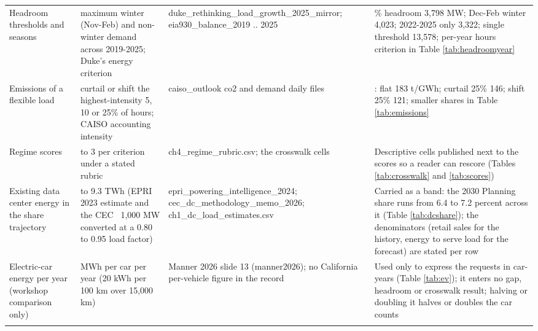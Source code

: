 \begin{longtable}{>{\raggedright\arraybackslash}p{2.3cm}>{\raggedright\arraybackslash}p{3.3cm}>{\raggedright\arraybackslash}p{2.8cm}>{\raggedright\arraybackslash}p{6.0cm}}
\addlinespace
Headroom thresholds and seasons & maximum winter (Nov-Feb) and non-winter demand across 2019-2025; Duke's energy criterion & duke\_\allowbreak{}rethinking\_\allowbreak{}load\_\allowbreak{}growth\_\allowbreak{}2025\_\allowbreak{}mirror; eia930\_\allowbreak{}balance\_\allowbreak{}2019 .. 2025 & 0.5\% headroom 3,798 MW; Dec-Feb winter 4,023; 2022-2025 only 3,322; single threshold 13,578; per-year hours criterion in Table \ref{tab:headroomyear} \\
\addlinespace
Emissions of a flexible load & curtail or shift the highest-intensity 5, 10 or 25\% of hours; CAISO accounting intensity & caiso\_\allowbreak{}outlook co2 and demand daily files & 2025: flat 183 t/GWh; curtail 25\% 146; shift 25\% 121; smaller shares in Table \ref{tab:emissions} \\
\addlinespace
Regime scores & 0 to 3 per criterion under a stated rubric & ch4\_\allowbreak{}regime\_\allowbreak{}rubric.csv; the crosswalk cells & Descriptive cells published next to the scores so a reader can rescore (Tables \ref{tab:crosswalk} and \ref{tab:scores}) \\
\addlinespace
Existing data center energy in the share trajectory & 7.0 to 9.3 TWh (EPRI 2023 estimate and the CEC ~1,000 MW converted at a 0.80 to 0.95 load factor) & epri\_\allowbreak{}powering\_\allowbreak{}intelligence\_\allowbreak{}2024; cec\_\allowbreak{}dc\_\allowbreak{}methodology\_\allowbreak{}memo\_\allowbreak{}2026; ch1\_\allowbreak{}dc\_\allowbreak{}load\_\allowbreak{}estimates.csv & Carried as a band: the 2030 Planning share runs from 6.4 to 7.2 percent across it (Table \ref{tab:dcshare}); the denominators (retail sales for the history, energy to serve load for the forecast) are stated per row \\
\addlinespace
Electric-car energy per year (workshop comparison only) & 3 MWh per car per year (20 kWh per 100 km over 15,000 km) & Manner 2026 slide 13 (manner2026); no California per-vehicle figure in the record & Used only to express the requests in car-years (Table \ref{tab:ev}); it enters no gap, headroom or crosswalk result; halving or doubling it halves or doubles the car counts \\
\addlinespace
\bottomrule
\end{longtable}